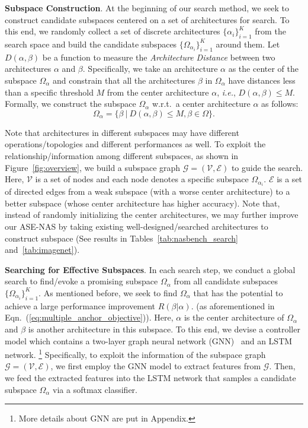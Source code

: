 \documentclass[lettersize,journal]{IEEEtran}
\newcommand{\sexyname}{ASE-NAS\xspace}
\def\mE{{\mathcal E}}
\def\mG{{\mathcal G}}
\def\mV{{\mathcal V}}
\def\ie{\emph{i.e.}} \def\Ie{\emph{I.e.}}
\def\wrt{{w.r.t.~}} \def\dof{d.o.f}
\begin{document}
\textbf{{Subspace Construction}}.
At the beginning of our search method, we seek to construct candidate subspaces centered on a set of architectures for search.
To this end, we randomly collect a set of discrete architectures $\{\alpha_i\}_{i=1}^{K}$ from the search space and build the candidate subspaces $\{\Omega_{\alpha_i}\}_{i=1}^{K}$ around them. 
Let $D({\alpha}, \beta)$ be a function to measure the \textit{Architecture Distance} between two architectures $\alpha$ and $\beta$.
Specifically, we take an architecture $\alpha$ as the center of the subspace $\Omega_{\alpha}$ and constrain that all the architectures $\beta$ in $\Omega_{\alpha}$ have distances less than a specific threshold $M$ from the center architecture $\alpha$, \ie, $D({\alpha}, \beta) \leq M$.
Formally, we construct the subspace $\Omega_{\alpha}$ \wrt a center architecture $\alpha$ as follows:
\begin{equation}\label{eq:subspace}
    \Omega_{\alpha}=\{{\beta} ~|~D({\alpha}, \beta) \leq M, \beta \in \Omega \}.
\end{equation}

Note that architectures in different subspaces may have different operations/topologies and different performances as well.
To exploit the relationship/information among different subspaces, as shown in Figure~\ref{fig:overview}, we build a subspace graph $\mG=(\mV,\mE)$ to guide the search. 
Here, $\mV$ is a set of nodes and each node denotes a specific subspace $\Omega_{\alpha_i}$. 
$\mE$ is a set of directed edges from a weak subspace (with a worse center architecture) to a better subspace (whose center architecture has higher accuracy). 
Note that, instead of randomly initializing the center architectures, we may further improve our \sexyname by taking existing well-designed/searched architectures to construct subspace (See results in Tables~\ref{tab:nasbench_search} and~\ref{tab:imagenet}).



\textbf{Searching for Effective Subspaces}.
In each search step, we conduct a global search to find/evoke a promising subspace $\Omega_{\alpha}$ from all candidate subspaces $\{\Omega_{\alpha_i}\}_{i=1}^{K}$. As mentioned before, we seek to find $\Omega_{\alpha}$ that has the potential to achieve a large performance improvement $R(\beta|\alpha)$. 
(as aforementioned in Eqn.~(\ref{eq:multiple_anchor_objective})). 
Here, $\alpha$ is the center architecture of $\Omega_{\alpha}$ and $\beta$ is another architecture in this subspace. To this end,  
we devise a controller model which contains a two-layer graph neural network (GNN)~\cite{you2020handling} and an LSTM network.
\footnote{More details about GNN are put in Appendix.}
Specifically, to exploit the information of the subspace graph $\mG=(\mV,\mE)$,
we first employ the GNN model to extract features from $\mG$. Then, we feed the extracted features into the LSTM network that samples a candidate subspace $\Omega_\alpha$ via a softmax classifier. 
\end{document}
